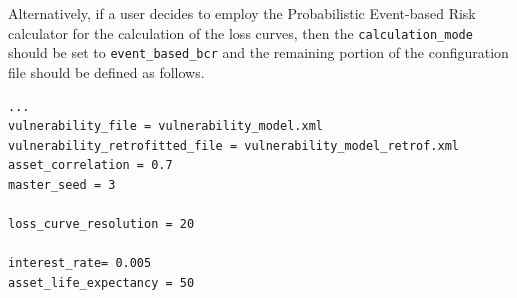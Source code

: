 Alternatively, if a user decides to employ the Probabilistic Event-based Risk calculator for the calculation of the loss curves, then the \Verb+calculation_mode+ should be set to \Verb+event_based_bcr+ and the remaining portion of the configuration file should be defined as follows.

\begin{Verbatim}[frame=single, commandchars=\\\{\}, samepage=true]
...
vulnerability_file = vulnerability_model.xml
vulnerability_retrofitted_file = vulnerability_model_retrof.xml
asset_correlation = 0.7
master_seed = 3

loss_curve_resolution = 20

interest_rate= 0.005
asset_life_expectancy = 50
\end{Verbatim}